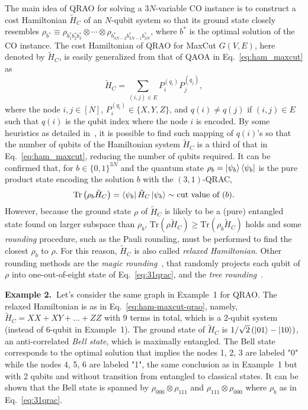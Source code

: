 \documentclass[conference,10pt]{IEEEtran}
\begin{document}
The main idea of QRAO for solving a $3N$-variable CO instance is to construct a cost Hamiltonian $\tilde{H}_{C}$ of an $N$-qubit system so that its ground state closely resembles $\rho_{b^*} \equiv \rho_{b_1^*b_2^*b_3^*} \otimes \cdots \otimes \rho_{b_{3N-2}^*b_{3N-1}^*b_{3N}^*}$, where $b^*$ is the optimal solution of the CO instance. 
The cost Hamiltonian of QRAO for MaxCut $G(V,E)$, here denoted by $\tilde{H}_C$, is easily generalized from that of QAOA in Eq.~\eqref{eq:ham_maxcut} as 
\begin{equation}
    \tilde{H}_C = \sum_{(i,j) \in E} P^{(q_i)}_i P^{(q_j)}_j, \label{eq:ham-maxcut-qrao}
\end{equation}
where the node $i, j \in [N]$, $P^{(q_i)}_i \in \{X, Y, Z\}$, and $q(i) \neq q(j)$ if $(i,j)\in E$ such that $q(i)$ is the qubit index where the node $i$ is encoded. By some heuristics as detailed in~\cite{Fulleretal2024}, it is possible to find such mapping of $q(i)$'s so that the number of qubits of the Hamiltonian system $\tilde{H}_C$ is a third of that in Eq.~\eqref{eq:ham_maxcut}, reducing the number of  qubits required. It can be confirmed that, for $b \in \{0,1\}^{3N}$ and the quantum state $\rho_b = \ket{\psi_b}\bra{\psi_b}$ is the pure product state encoding the solution $b$ with the $(3,1)$-QRAC, 
$$
\mbox{Tr}\left(\rho_b \tilde{H}_C \right) = \bra{\psi_b} \tilde{H}_C \ket{\psi_b} \sim \mbox{cut value of }(b). 
$$
However, because the ground state $\rho$ of $\tilde{H}_C$ is likely to be a (pure) entangled state found on larger subspace than $\rho_b$, $\mbox{Tr}\left(\rho \tilde{H}_C \right) \ge \mbox{Tr}\left(\rho_b \tilde{H}_C \right)$ holds and some \emph{rounding} procedure, such as the Pauli rounding, must be performed to find the closest $\rho_b$ to $\rho$. For this reason, $\tilde{H}_C$ is also called \emph{relaxed Hamiltonian}. Other rounding methods are the \emph{magic rounding}~\cite{Fulleretal2024}, that randomly projects each qubit of $\rho$ into one-out-of-eight state of Eq.~\eqref{eq:31qrac}, and the \emph{tree rounding}~\cite{kondo2024recursive}.  

\noindent\textbf{Example 2.~}Let's consider the same graph in Example~1 for QRAO. The relaxed Hamiltonian is as in Eq.~\eqref{eq:ham-maxcut-qrao}, namely, $\tilde{H}_C = XX + XY + \ldots + ZZ$ with $9$ terms in total, which is a 2-qubit system (instead of 6-qubit in Example~1). The ground state of $\tilde{H}_C$ is $1/\sqrt{2} \left( \ket{01} - \ket{10} \right)$, an anti-correlated \emph{Bell state}, which is maximally entangled. The Bell state corresponds to the optimal solution that implies the nodes 1, 2, 3 are labeled "0" while the nodes 4, 5, 6 are labeled "1", the same conclusion as in Example~1 but with 2 qubits and without transition from entangled to classical states. It can be shown that the Bell state is spanned by $\rho_{000} \otimes \rho_{111}$ and $\rho_{111} \otimes \rho_{000}$ where $\rho_b$ as in Eq.~\eqref{eq:31qrac}.     
\end{document}
